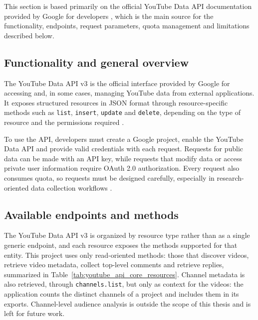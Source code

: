 This section is based primarily on the official YouTube Data API documentation provided by Google for developers \autocite{youtube_data_api_docs}, which is the main source for the functionality, endpoints, request parameters, quota management and limitations described below.

\subsection{Functionality and general overview}

The YouTube Data API v3 is the official interface provided by Google for accessing and, in some cases, managing YouTube data from external applications. It exposes structured resources in JSON format through resource-specific methods such as \texttt{list}, \texttt{insert}, \texttt{update} and \texttt{delete}, depending on the type of resource and the permissions required \autocite{youtube_data_api_docs}.

To use the API, developers must create a Google project, enable the YouTube Data API and provide valid credentials with each request. Requests for public data can be made with an API key, while requests that modify data or access private user information require OAuth 2.0 authorization. Every request also consumes quota, so requests must be designed carefully, especially in research-oriented data collection workflows \autocite{youtube_data_api_docs}.

\subsection{Available endpoints and methods}

The YouTube Data API v3 is organized by resource type rather than as a single generic endpoint, and each resource exposes the methods supported for that entity. This project uses only read-oriented methods: those that discover videos, retrieve video metadata, collect top-level comments and retrieve replies, summarized in Table~\ref{tab:youtube_api_core_resources}. Channel metadata is also retrieved, through \texttt{channels.\allowbreak list}, but only as context for the videos: the application counts the distinct channels of a project and includes them in its exports. Channel-level audience analysis is outside the scope of this thesis and is left for future work.

